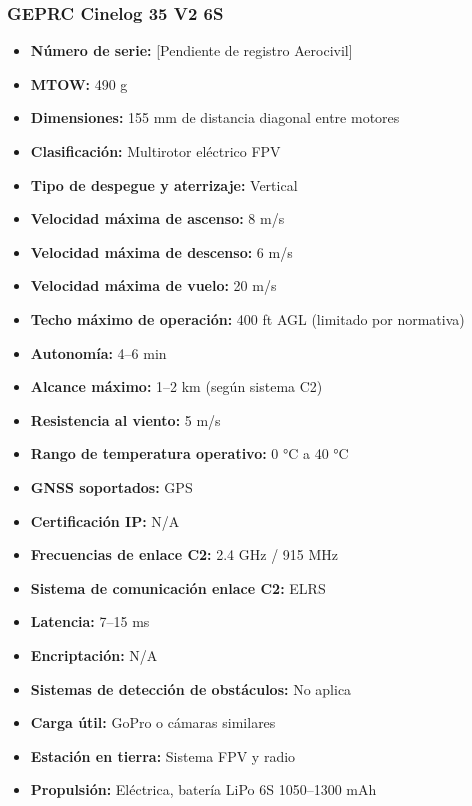\subsubsection*{GEPRC Cinelog 35 V2 6S}
\begin{itemize}
    \item \textbf{Número de serie:} [Pendiente de registro Aerocivil]
    \item \textbf{MTOW:} 490 g
    \item \textbf{Dimensiones:} 155 mm de distancia diagonal entre motores
    \item \textbf{Clasificación:} Multirotor eléctrico FPV
    \item \textbf{Tipo de despegue y aterrizaje:} Vertical
    \item \textbf{Velocidad máxima de ascenso:} 8 m/s
    \item \textbf{Velocidad máxima de descenso:} 6 m/s
    \item \textbf{Velocidad máxima de vuelo:} 20 m/s
    \item \textbf{Techo máximo de operación:} 400 ft AGL (limitado por normativa)
    \item \textbf{Autonomía:} 4–6 min
    \item \textbf{Alcance máximo:} 1–2 km (según sistema C2)
    \item \textbf{Resistencia al viento:} 5 m/s
    \item \textbf{Rango de temperatura operativo:} 0 °C a 40 °C
    \item \textbf{GNSS soportados:} GPS 
    \item \textbf{Certificación IP:} N/A
    \item \textbf{Frecuencias de enlace C2:} 2.4 GHz / 915 MHz
    \item \textbf{Sistema de comunicación enlace C2:} ELRS 
    \item \textbf{Latencia:} 7–15 ms
    \item \textbf{Encriptación:} N/A
    \item \textbf{Sistemas de detección de obstáculos:} No aplica
    \item \textbf{Carga útil:} GoPro o cámaras similares
    \item \textbf{Estación en tierra:} Sistema FPV y radio
    \item \textbf{Propulsión:} Eléctrica, batería LiPo 6S 1050–1300 mAh
\end{itemize}
